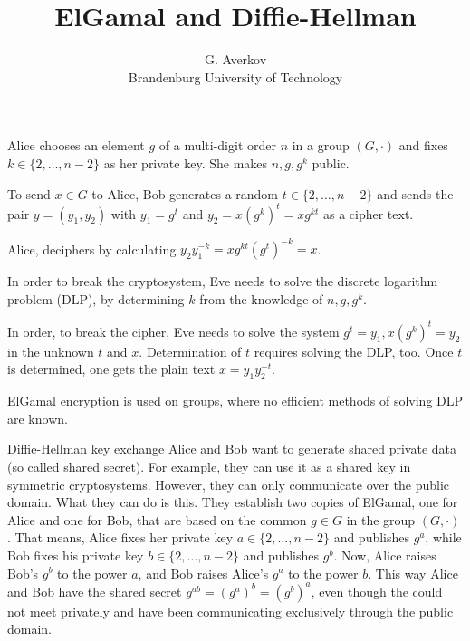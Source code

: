 \documentclass{beamer}
\title{ElGamal and Diffie-Hellman}
\author{G. Averkov \\ Brandenburg University of Technology}
\begin{document}
\begin{frame}[plain]
    \maketitle
\end{frame}

\begin{frame} 
	Alice chooses an element $g$ of a multi-digit order $n$ in a group $(G,\cdot)$ and fixes $k \in \{2,\ldots,n-2\}$ as her private key. She makes  $n, g, g^k$ public. 
	\pause 
	
	\vspace{2mm} To send $x \in G$ to Alice, Bob generates a random $t \in \{2,\ldots,n-2\}$ and sends the pair $y = (y_1,y_2)$ with $y_1 = g^t$ and $y_ 2 = x (g^k)^t = x g^{kt}$ as a cipher text. 
	
	\pause 
	
	\vspace{2mm} Alice, deciphers by calculating $y_2  y_1^{-k} = x g^{kt} (g^t)^{-k} = x$. 
	
\end{frame} 

\begin{frame} 
		In order to break the cryptosystem, Eve needs to solve the discrete logarithm problem (DLP), by determining $k$ from the knowledge of $n, g, g^k$. 
		
		\pause 
		
		\vspace{2mm} In order, to break the cipher, Eve needs to solve the system $g^t = y_1, x (g^k)^t = y_2$ in the unknown $t$ and $x$. Determination of $t$ requires solving the DLP, too. Once $t$ is determined, one gets the plain text $x = y_1 y_2^{-t}$. 
		
		\pause 
		
		\vspace{2mm} ElGamal encryption is used on groups, where no efficient methods of solving DLP are known. 
	
\end{frame} 

\begin{frame}{Diffie-Hellman key exchange}
	Alice and Bob want to generate shared private data (so called shared secret). For example, they can use it as a shared key in symmetric cryptosystems. However, they can only communicate over the public domain. What they can do is this. They establish two copies of ElGamal, one for Alice and one for Bob, that are based on the common $g \in G$ in the group $(G,\cdot)$. That means, Alice fixes her private key $a \in \{2,\ldots,n-2\}$ and publishes $g^a$, while Bob fixes his private key $b \in \{2,\ldots,n-2\}$ and publishes $g^b$. Now, Alice raises Bob's $g^b$ to the power $a$, and Bob raises Alice's $g^a$ to the power $b$. This way Alice and Bob have the shared secret $g^{ab} = (g^a)^b = (g^b)^a$, even though the could not meet privately and have been communicating exclusively through the public domain. 
\end{frame} 
\end{document}
